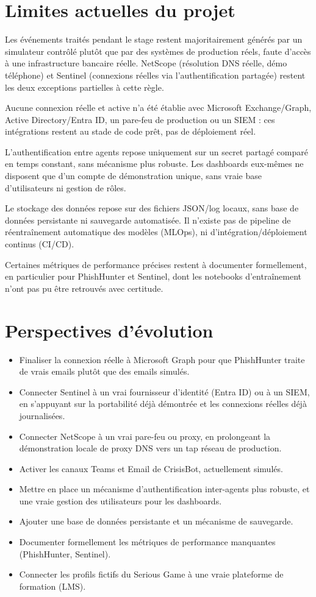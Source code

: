 \documentclass[12pt,a4paper]{report}
\begin{document}
\section{Limites actuelles du projet}

Les événements traités pendant le stage restent majoritairement générés par un simulateur contrôlé plutôt que par des systèmes de production réels, faute d'accès à une infrastructure bancaire réelle. NetScope (résolution DNS réelle, démo téléphone) et Sentinel (connexions réelles via l'authentification partagée) restent les deux exceptions partielles à cette règle.

Aucune connexion réelle et active n'a été établie avec Microsoft Exchange/Graph, Active Directory/Entra ID, un pare-feu de production ou un SIEM : ces intégrations restent au stade de code prêt, pas de déploiement réel.

L'authentification entre agents repose uniquement sur un secret partagé comparé en temps constant, sans mécanisme plus robuste. Les dashboards eux-mêmes ne disposent que d'un compte de démonstration unique, sans vraie base d'utilisateurs ni gestion de rôles.

Le stockage des données repose sur des fichiers JSON/log locaux, sans base de données persistante ni sauvegarde automatisée. Il n'existe pas de pipeline de réentraînement automatique des modèles (MLOps), ni d'intégration/déploiement continus (CI/CD).

Certaines métriques de performance précises restent à documenter formellement, en particulier pour PhishHunter et Sentinel, dont les notebooks d'entraînement n'ont pas pu être retrouvés avec certitude.

\section{Perspectives d'évolution}

\begin{itemize}[nosep]
\item Finaliser la connexion réelle à Microsoft Graph pour que PhishHunter traite de vrais emails plutôt que des emails simulés.
\item Connecter Sentinel à un vrai fournisseur d'identité (Entra ID) ou à un SIEM, en s'appuyant sur la portabilité déjà démontrée et les connexions réelles déjà journalisées.
\item Connecter NetScope à un vrai pare-feu ou proxy, en prolongeant la démonstration locale de proxy DNS vers un tap réseau de production.
\item Activer les canaux Teams et Email de CrisisBot, actuellement simulés.
\item Mettre en place un mécanisme d'authentification inter-agents plus robuste, et une vraie gestion des utilisateurs pour les dashboards.
\item Ajouter une base de données persistante et un mécanisme de sauvegarde.
\item Documenter formellement les métriques de performance manquantes (PhishHunter, Sentinel).
\item Connecter les profils fictifs du Serious Game à une vraie plateforme de formation (LMS).
\end{itemize}
\end{document}
